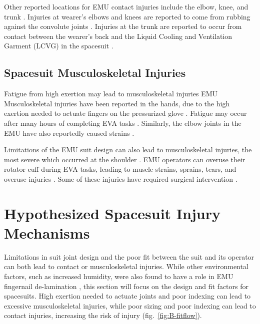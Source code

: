 \documentclass[defaultstyle,11pt]{thesis}
\begin{document}
Other reported locations for EMU contact injuries include the elbow, knee, and trunk \citep{Strauss2004, Scheuring2012}.
Injuries at wearer's elbows and knees are reported to come from rubbing against the convolute joints \citep{Strauss2004}.
Injuries at the trunk are reported to occur from contact between the wearer's back and the Liquid Cooling and Ventilation Garment (LCVG) in the spacesuit \citep{Strauss2004}.

\hypertarget{spacesuit-musculoskeletal-injuries}{%
\subsection{Spacesuit Musculoskeletal Injuries}\label{spacesuit-musculoskeletal-injuries}}

Fatigue from high exertion may lead to musculoskeletal injuries
EMU Musculoskeletal injuries have been reported in the hands, due to the high exertion needed to actuate fingers on the pressurized glove \citep{Viegas2004}.
Fatigue may occur after many hours of completing EVA tasks \citep{Strauss2004, Scheuring2012}.
Similarly, the elbow joints in the EMU have also reportedly caused strains \citep{Strauss2004}.

Limitations of the EMU suit design can also lead to musculoskeletal injuries, the most severe which occurred at the shoulder \citep{Strauss2004}.
EMU operators can overuse their rotator cuff during EVA tasks, leading to muscle strains, sprains, tears, and overuse injuries \citep{Williams2003, Strauss2004, Strauss2005, Scheuring2012}.
Some of these injuries have required surgical intervention \citep{Strauss2005}.

\hypertarget{hypothesized-spacesuit-injury-mechanisms}{%
\section{Hypothesized Spacesuit Injury Mechanisms}\label{hypothesized-spacesuit-injury-mechanisms}}

Limitations in suit joint design and the poor fit between the suit and its operator can both lead to contact or musculoskeletal injuries.
While other environmental factors, such as increased humidity, were also found to have a role in EMU fingernail de-lamination \citep{Chappell2017}, this section will focus on the design and fit factors for spacesuits.
High exertion needed to actuate joints and poor indexing can lead to excessive musculoskeletal injuries, while poor sizing and poor indexing can lead to contact injuries, increasing the risk of injury (fig.~\ref{fig:B-fitflow}).
\end{document}
